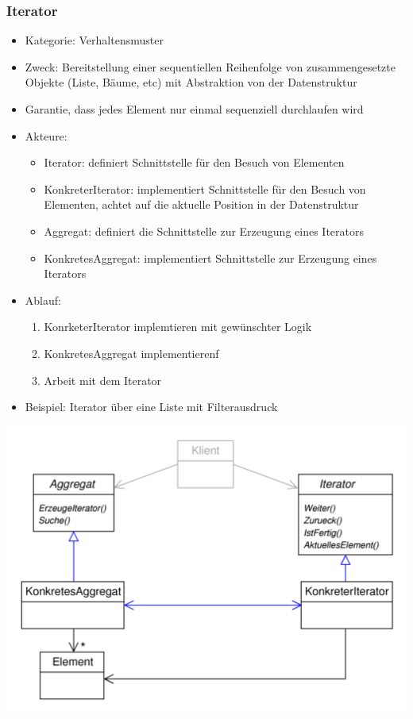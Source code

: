 \documentclass[11pt, fleqn, a4paper, leqno]{scrartcl} %
\begin{document}
		\subsubsection{Iterator}
			\begin{itemize}
				\item Kategorie: Verhaltensmuster
				\item Zweck: Bereitstellung einer sequentiellen Reihenfolge von zusammengesetzte Objekte (Liste, Bäume, etc) mit Abstraktion von der Datenstruktur
				
				\item Garantie, dass jedes Element nur einmal sequenziell durchlaufen wird
				\item Akteure: 
					\begin{itemize}
						\item Iterator: definiert Schnittstelle für den Besuch von Elementen
						\item KonkreterIterator: implementiert Schnittstelle für den Besuch von Elementen, achtet auf die aktuelle Position in der Datenstruktur
						\item Aggregat: definiert die Schnittstelle zur Erzeugung eines Iterators
						\item KonkretesAggregat: implementiert Schnittstelle zur Erzeugung eines Iterators
					\end{itemize}
				\item Ablauf:
					\begin{enumerate}
						\item KonrketerIterator implemtieren mit gewünschter Logik
						\item KonkretesAggregat implementierenf
						\item Arbeit mit dem Iterator
					\end{enumerate}
				\item Beispiel: Iterator über eine Liste mit Filterausdruck
			\end{itemize}
			\includegraphics[scale=0.8]{images/iterator.png}
			\newpage
\end{document}

